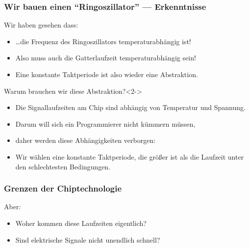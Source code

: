 \begin{frame}
	\frametitle{Wir bauen einen ``Ringoszillator'' --- Erkenntnisse}

	\begin{block}{Wir haben gesehen dass:}
		\begin{itemize}
			\item \ldots die Frequenz des Ringoszillators temperaturabhängig ist!
			\item Also muss auch die Gatterlaufzeit temperaturabhängig sein!
			\item Eine konstante Taktperiode ist also wieder eine
				Abstraktion.
		\end{itemize}
	\end{block}

	\begin{block}{Warum brauchen wir diese Abstraktion?}<2->
		\begin{itemize}
			\item Die Signallaufzeiten am Chip sind abhängig von Temperatur und Spannung.
			\item Darum will sich ein Programmierer nicht kümmern müssen,
			\item daher werden diese Abhängigkeiten verborgen:
			\item Wir wählen eine konstante Taktperiode, die größer ist als die Laufzeit unter
				den schlechtesten Bedingungen.
		\end{itemize}
	\end{block}
\end{frame}

\begin{frame}
	\frametitle{Grenzen der Chiptechnologie}

	\begin{alertblock}{Aber:}
		\begin{itemize}
			\item Woher kommen diese Laufzeiten eigentlich?
			\item Sind elektrische Signale nicht unendlich schnell?
		\end{itemize}
	\end{alertblock}

\end{frame}

